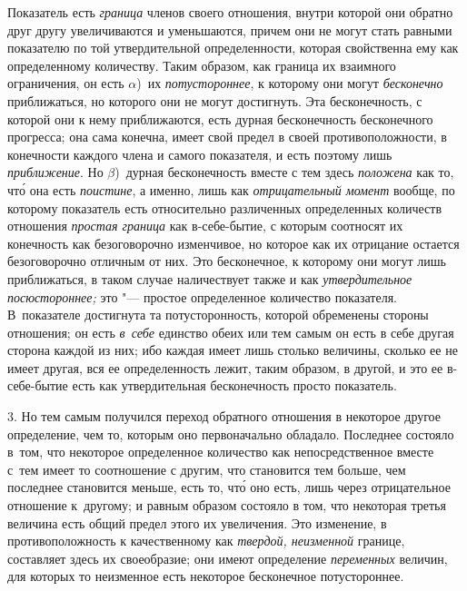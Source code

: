 Показатель есть {\em граница} членов своего отношения, внутри которой они
обратно друг другу увеличиваются и уменьшаются, причем они не могут стать
равными показателю по той утвердительной определенности, которая свойственна
ему как определенному количеству. Таким образом, как граница их взаимного
ограничения, он есть $\alpha$)~их {\em потустороннее}, к которому они могут
{\em бесконечно} приближаться, но которого они не могут достигнуть. Эта
бесконечность, с которой они к нему приближаются, есть дурная бесконечность
бесконечного прогресса; она сама конечна, имеет свой предел в своей
противоположности, в конечности каждого члена и самого показателя, и есть
поэтому лишь {\em приближение}. Но $\beta$)~дурная бесконечность вместе
с тем здесь {\em положена} как то, чт\'{о} она есть {\em поистине}, а именно,
лишь как {\em отрицательный момент} вообще, по которому показатель есть
относительно различенных определенных количеств отношения {\em простая граница}
как в-себе-бытие, с которым соотносят их конечность как безоговорочно
изменчивое, но которое как их отрицание остается безоговорочно отличным от них.
Это бесконечное, к которому они могут лишь приближаться, в таком случае
наличествует также и как {\em утвердительное посюстороннее;} это "--- простое
определенное количество показателя. В~показателе достигнута та потусторонность,
которой обременены стороны отношения; он есть {\em в~себе} единство обеих или
тем самым он есть в себе другая сторона каждой из них; ибо каждая имеет лишь
столько величины, сколько ее не имеет другая, вся ее определенность лежит,
таким образом, в другой, и это ее в-себе-бытие есть как утвердительная
бесконечность просто показатель.

3. Но тем самым получился переход обратного отношения в некоторое другое
определение, чем то, которым оно первоначально обладало. Последнее состояло
в~том, что некоторое определенное количество как непосредственное вместе с~тем
имеет то соотношение с другим, что становится тем больше, чем последнее
становится меньше, есть то, чт\'{о} оно есть, лишь через отрицательное
отношение к~другому; и равным образом состояло в том, что некоторая третья
величина есть общий предел этого их увеличения. Это изменение, в
противоположность к качественному как {\em твердой, неизменной} границе,
составляет здесь их своеобразие; они имеют определение {\em переменных}
величин, для которых то неизменное есть некоторое бесконечное потустороннее.

